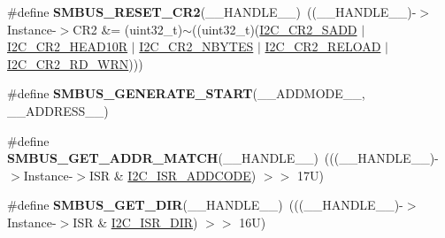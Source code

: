 \begin{DoxyCompactItemize}
\item 
\mbox{\label{group___s_m_b_u_s___private___macro_ga589cc1dee6b1f64f6026add38afdb106}} 
\#define {\bfseries S\+M\+B\+U\+S\+\_\+\+R\+E\+S\+E\+T\+\_\+\+C\+R2}(\+\_\+\+\_\+\+H\+A\+N\+D\+L\+E\+\_\+\+\_\+)~((\+\_\+\+\_\+\+H\+A\+N\+D\+L\+E\+\_\+\+\_\+)-\/$>$Instance-\/$>$C\+R2 \&= (uint32\+\_\+t)$\sim$((uint32\+\_\+t)(\hyperlink{group___peripheral___registers___bits___definition_ga1a0478d3d85fc6aba608390ee2ea2d1c}{I2\+C\+\_\+\+C\+R2\+\_\+\+S\+A\+DD} $\vert$ \hyperlink{group___peripheral___registers___bits___definition_ga2de0f12e6fb297c2c29bee5504e54377}{I2\+C\+\_\+\+C\+R2\+\_\+\+H\+E\+A\+D10R} $\vert$ \hyperlink{group___peripheral___registers___bits___definition_ga23a58895a897ccc34a8cbbe36b412b69}{I2\+C\+\_\+\+C\+R2\+\_\+\+N\+B\+Y\+T\+ES} $\vert$ \hyperlink{group___peripheral___registers___bits___definition_ga21a796045451013c964ef8b12ca6c9bb}{I2\+C\+\_\+\+C\+R2\+\_\+\+R\+E\+L\+O\+AD} $\vert$ \hyperlink{group___peripheral___registers___bits___definition_ga268ec714bbe4a75ea098c0e230a87697}{I2\+C\+\_\+\+C\+R2\+\_\+\+R\+D\+\_\+\+W\+RN})))
\item 
\#define {\bfseries S\+M\+B\+U\+S\+\_\+\+G\+E\+N\+E\+R\+A\+T\+E\+\_\+\+S\+T\+A\+RT}(\+\_\+\+\_\+\+A\+D\+D\+M\+O\+D\+E\+\_\+\+\_\+,  \+\_\+\+\_\+\+A\+D\+D\+R\+E\+S\+S\+\_\+\+\_\+)
\item 
\mbox{\label{group___s_m_b_u_s___private___macro_gafca9d4e7bba6554b8160a5961e8ed54e}} 
\#define {\bfseries S\+M\+B\+U\+S\+\_\+\+G\+E\+T\+\_\+\+A\+D\+D\+R\+\_\+\+M\+A\+T\+CH}(\+\_\+\+\_\+\+H\+A\+N\+D\+L\+E\+\_\+\+\_\+)~(((\+\_\+\+\_\+\+H\+A\+N\+D\+L\+E\+\_\+\+\_\+)-\/$>$Instance-\/$>$I\+SR \& \hyperlink{group___peripheral___registers___bits___definition_ga9050a7e2c1d8777251352f51197e4c80}{I2\+C\+\_\+\+I\+S\+R\+\_\+\+A\+D\+D\+C\+O\+DE}) $>$$>$ 17\+U)
\item 
\mbox{\label{group___s_m_b_u_s___private___macro_gacdf273ea8be3280dd1655ac8fa9bd95f}} 
\#define {\bfseries S\+M\+B\+U\+S\+\_\+\+G\+E\+T\+\_\+\+D\+IR}(\+\_\+\+\_\+\+H\+A\+N\+D\+L\+E\+\_\+\+\_\+)~(((\+\_\+\+\_\+\+H\+A\+N\+D\+L\+E\+\_\+\+\_\+)-\/$>$Instance-\/$>$I\+SR \& \hyperlink{group___peripheral___registers___bits___definition_gaa4890d7deb94106f946b28a7309e22aa}{I2\+C\+\_\+\+I\+S\+R\+\_\+\+D\+IR}) $>$$>$ 16\+U)
\item 
\mbox{\label{group___s_m_b_u_s___private___macro_ga76009d83692a1ce38ccb2f9e40b3f61d}} 

\end{DoxyCompactItemize}
